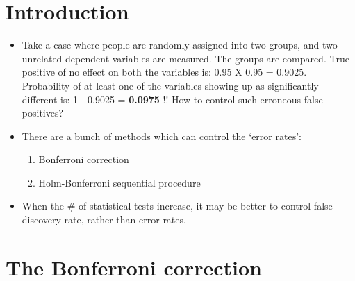 \documentclass[
]{book}
\providecommand{\tightlist}{%
  \setlength{\itemsep}{0pt}\setlength{\parskip}{0pt}}
\begin{document}
\hypertarget{introduction-9}{%
\section{Introduction}\label{introduction-9}}

\begin{itemize}
\item
  Take a case where people are randomly assigned into two groups, and two unrelated dependent variables are measured. The groups are compared. True positive of no effect on both the variables is: 0.95 X 0.95 = 0.9025. Probability of at least one of the variables showing up as significantly different is: 1 - 0.9025 = \textbf{0.0975} !! How to control such erroneous false positives?
\item
  There are a bunch of methods which can control the `error rates':

  \begin{enumerate}
  \def\labelenumi{\arabic{enumi}.}
  \tightlist
  \item
    Bonferroni correction
  \item
    Holm-Bonferroni sequential procedure
  \end{enumerate}
\item
  When the \# of statistical tests increase, it may be better to control false discovery rate, rather than error rates.
\end{itemize}

\hypertarget{the-bonferroni-correction}{%
\section{The Bonferroni correction}\label{the-bonferroni-correction}}
\end{document}
